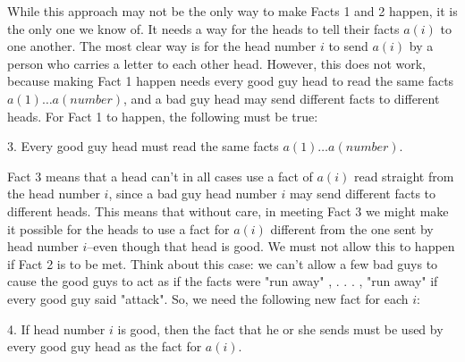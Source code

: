 \documentclass{article}
\begin{document}
While this approach may not be the only way to make Facts 1 and 2 happen, it is the only one we know of.
It needs a way for the heads to tell their facts $a(i)$ to one another. The most clear way is for the head number $i$ to send $a(i)$ by a person who carries a letter to each other head. However, this does not work, because making Fact 1 happen needs every good guy head to read the same facts $a(1) \dots a(number)$, and a bad guy head may send different facts to different heads. For Fact 1 to happen, the following must be true:

3. Every good guy head must read the same facts $a(1) \dots a(number)$.

Fact 3 means that a head can't in all cases use a fact of $a(i)$ read straight from the head number $i$, since a bad guy head number $i$ may send different facts to different heads.
This means that without care, in meeting Fact 3 we might make it possible for the heads to use a fact for $a(i)$ different from the one sent by head number $i$--even though that head is good.
We must not allow this to happen if Fact 2 is to be met. Think about this case: we can't allow a few bad guys to cause the good guys to act as if the facts were "run away" , . . . , "run away" if every good guy said "attack".
So, we need the following new fact for each $i$:

4. If head number $i$ is good, then the fact that he or she sends must be used by every good guy head as the fact for $a(i)$.
\end{document}
